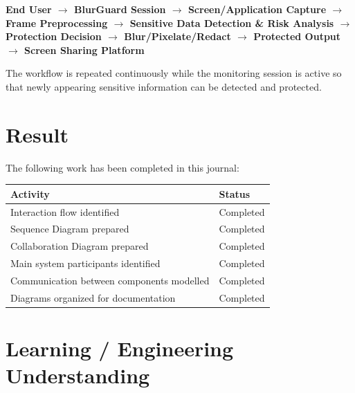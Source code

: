 \documentclass[12pt,a4paper]{article}
\begin{document}
\begin{center}
\textbf{
End User
$\rightarrow$
BlurGuard Session
$\rightarrow$
Screen/Application Capture
$\rightarrow$
Frame Preprocessing
$\rightarrow$
Sensitive Data Detection \& Risk Analysis
$\rightarrow$
Protection Decision
$\rightarrow$
Blur/Pixelate/Redact
$\rightarrow$
Protected Output
$\rightarrow$
Screen Sharing Platform
}
\end{center}

The workflow is repeated continuously while the monitoring session is active so that newly appearing sensitive information can be detected and protected.



\section{Result}

The following work has been completed in this journal:

\vspace{0.2cm}

\begin{center}
\renewcommand{\arraystretch}{1.35}

\begin{tabular}{|p{9.5cm}|p{4.5cm}|}
\hline
\textbf{Activity} & \textbf{Status} \\
\hline
Interaction flow identified & Completed \\
\hline
Sequence Diagram prepared & Completed \\
\hline
Collaboration Diagram prepared & Completed \\
\hline
Main system participants identified & Completed \\
\hline
Communication between components modelled & Completed \\
\hline
Diagrams organized for documentation & Completed \\
\hline
\end{tabular}

\end{center}



\section{Learning / Engineering Understanding}
\end{document}
